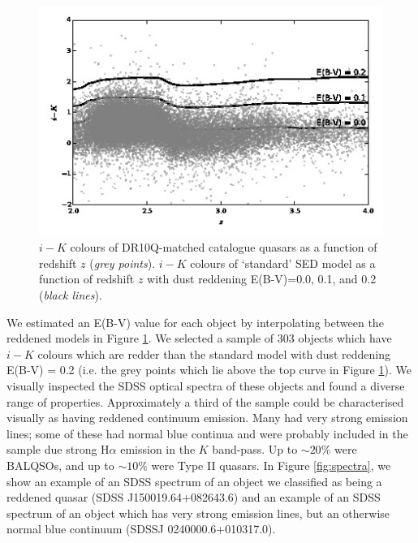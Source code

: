 \begin{figure}
  \centering
  \includegraphics[width=\textwidth]{figures/chapter06/ikvz.jpg}
  \caption{$i-K$ colours of DR10Q-matched catalogue quasars as a function of redshift $z$ ({\it grey points}). $i - K$ colours of `standard' SED model as a function of redshift $z$ with dust reddening E(B-V)=0.0, 0.1, and 0.2 ({\it black lines}).}
  \label{fig:ikvz}
\end{figure}

We estimated an E(B-V) value for each object by interpolating between the reddened models in Figure \ref{fig:ikvz}. We selected a sample of 303 objects which have $i-K$ colours which are redder than the standard model with dust reddening E(B-V) = 0.2 (i.e. the grey points which lie above the top curve in Figure \ref{fig:ikvz}). We visually inspected the SDSS optical spectra of these objects and found a diverse range of properties. Approximately a third of the sample could be characterised visually as having reddened continuum emission. Many had very strong emission lines; some of these had normal blue continua and were probably included in the sample due strong H$\alpha$ emission in the $K$ band-pass. Up to $\sim 20\%$ were BALQSOs, and up to $\sim 10\%$ were Type II quasars. In Figure \ref{fig:spectra}, we show an example of an SDSS spectrum of an object we classified as being a reddened quasar (SDSS J150019.64+082643.6) and an example of an SDSS spectrum of an object which has very strong emission lines, but an otherwise normal blue continuum (SDSSJ 0240000.6+010317.0).  

